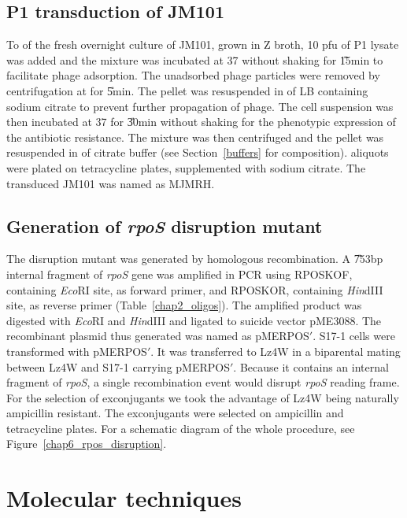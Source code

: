 \subsection{P1 transduction of JM101}
\label{P1_transduction}

To  of the fresh overnight culture of JM101, grown in Z
broth, 10 pfu of P1 lysate was added and the mixture was
incubated at 37\dg{} without shaking for \U{15}{min} to facilitate
phage adsorption. The unadsorbed phage particles were removed by
centrifugation at  for \U{5}{min}. The pellet was
resuspended in  of LB containing  sodium citrate to
prevent further propagation of phage. The cell suspension was then
incubated at 37\dg{} for \U{30}{min} without shaking for the
phenotypic expression of the antibiotic resistance. The mixture
was then centrifuged and the pellet was resuspended in  of
citrate buffer (see Section~\ref{buffers} for composition).
 aliquots were plated on tetracycline plates,
supplemented with  sodium citrate. The transduced JM101
was named as MJMRH.

\subsection{Generation of \emph{rpoS} disruption mutant}
\label{chap2_disrupt}

The  disruption mutant was generated by homologous
recombination. A \U{753}{bp} internal fragment of \emph{rpoS} gene
was amplified in PCR using RPOSKOF, containing \emph{Eco}RI site,
as forward primer, and RPOSKOR, containing \emph{Hin}dIII site, as
reverse primer (Table~\ref{chap2_oligos}). The amplified product
was digested with \emph{Eco}RI and \emph{Hin}dIII and ligated to
suicide vector pME3088. The recombinant plasmid thus generated was
named as pMERPOS$'$. \mbox{S17-1} cells were transformed with
pMERPOS$'$\@. It was transferred to Lz4W in a biparental mating
between Lz4W and S17-1 carrying pME\-RPOS$'$. Because it contains
an internal fragment of \emph{rpoS}, a single recombination event
would disrupt \emph{rpoS} reading frame. For the selection of
exconjugants we took the advantage of Lz4W being naturally
ampicillin resistant. The exconjugants were selected on ampicillin
and tetracycline plates. For a schematic diagram of the whole
procedure, see Figure~\ref{chap6_rpos_disruption}.

\section{Molecular techniques}


